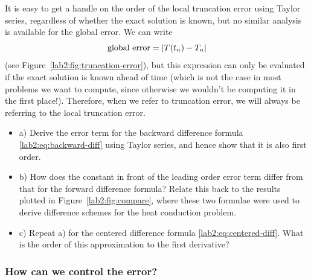 It is easy to get a handle on the order of the local truncation
error using  Taylor series, regardless of whether the exact solution is
known, but no similar analysis is available for the global
error.  We can write
\[
\mbox{\rm global error} = |T(t_n)-T_n|
\]
(see Figure~\ref{lab2:fig:truncation-error}),  but this expression
can only be evaluated if the exact solution is known ahead of 
time (which is not the case in most problems we want to compute,
since otherwise we wouldn't be computing it in the first place!).
Therefore, when we refer to truncation error, we will 
always be referring to the local truncation error.

\begin{problem}
  \label{lab2:prob:taylor}
  \begin {itemize}
  \item a)
  Derive the error term for the backward difference formula
  \eqref{lab2:eq:backward-diff} using 
  Taylor series, and hence show that it is also first order.
  
   \item b)
  How does the constant in front of the leading order error term
  differ from that for the forward difference formula?  
  Relate this back to the results plotted in
  Figure~\ref{lab2:fig:compare}, where these two formulae were used to
  derive difference schemes for the heat conduction problem. 

  \item c)
  Repeat a) for the centered difference formula
  \eqref{lab2:eq:centered-diff}.  What is the order of this
  approximation to the first derivative?

  \end {itemize}
\end{problem}

\subsubsection{How can we control the error?}

